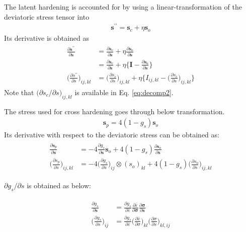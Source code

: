 \documentclass[12pt]{amsart}
\begin{document}
The latent hardening is accounted for by using a linear-transformation of the deviatoric stress tensor into
\begin{eqnarray}
  \label{eq:latent_decompose1}
  \mathbf{s}^{\prime\prime}=\mathbf{s}_c+\eta \mathbf{s}_o
\end{eqnarray}
Its derivative is obtained as
\begin{eqnarray}
  \begin{split}
    \label{eq:latent_decompose2}
    \frac{\partial\mathbf{s}^{\prime\prime}}{\partial\mathbf{s}} &=\frac{\partial\mathbf{s}_c}{\partial\mathbf{s}} + \eta \frac{\partial\mathbf{s}_o}{\partial\mathbf{s}}\\
    &=\frac{\partial\mathbf{s}_c}{\partial\mathbf{s}} + \eta \Big\{\mathbf{I} -   \frac{\partial\mathbf{s_c}}{\partial\mathbf{s}}\Big\}\\
    \bigg(\frac{\partial s^{\prime\prime}}{\partial s}\bigg)_{ij,kl} &=\bigg( \frac{\partial s_c}{\partial s}\bigg)_{ij,kl} + \eta \bigg\{I_{ij,kl} -   \bigg(\frac{\partial s_c}{\partial s}\bigg)_{ij,kl} \bigg\}
  \end{split}
\end{eqnarray}
Note that $\big(\partial s_c / \partial s\big)_{ij,kl}$ is available in Eq. \ref{eq:decomp2}.

The stress used for cross hardening goes through below transformation.
\begin{eqnarray}
  \label{eq:cross_linear1}
  \mathbf{s}_p = 4(1-g_s)\mathbf{s}_o
\end{eqnarray}
Its derivative with respect to the deviatoric stress can be obtained as:
\begin{eqnarray}
  \begin{split}
    \label{eq:cross_linear2}
    \frac{\partial\mathbf{s}_p}{\partial\mathbf{s}}                 &= -4 \frac{\partial g_s}{\partial\mathbf{s}} \mathbf{s}_o + 4(1-g_s) \frac{\partial\mathbf{s}_o}{\partial\mathbf{s}} \\
    \bigg(\frac{\partial s_p}{\partial s} \bigg)_{ij,kl} &= -4 \bigg(\frac{\partial g_s}{\partial s}\bigg)_{ij}\otimes (s_o)_{kl} + 4(1-g_s) \bigg(\frac{\partial s_o}{\partial s}\bigg)_{ij,kl}
  \end{split}
\end{eqnarray}

$\partial g_s/ \partial s$ is obtained as below:

\begin{eqnarray}
  \begin{split}
    \label{eq:cross_linear3}
    \frac{\partial g_s}{\partial\mathbf{s}}         &=\frac{\partial g_s}{\partial \bar{\varepsilon}} \frac{\partial\bar{\varepsilon}}{\partial\mathbf{\sigma}} \frac{\partial\mathbf{\sigma}}{\partial\mathbf{s}}\\
    \bigg(\frac{\partial g_s}{\partial s}\bigg)_{ij}&=\frac{\partial g_s}{\partial \bar{\varepsilon}} \bigg(\frac{\partial\bar{\varepsilon}}{\partial\sigma}\bigg)_{kl} \bigg(\frac{\partial\sigma}{\partial s}\bigg)_{kl,ij}
  \end{split}
\end{eqnarray}
\end{document}
